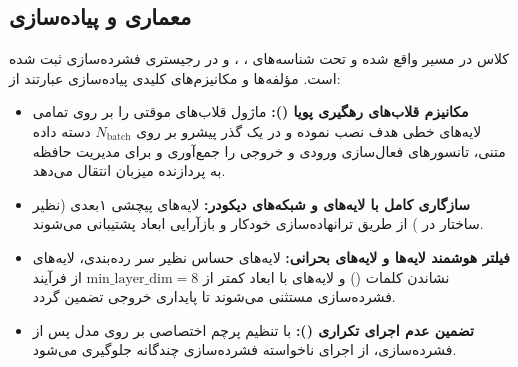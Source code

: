 \subsection{معماری و پیاده‌سازی}
کلاس  در مسیر  واقع شده و تحت شناسه‌های ، ،  و  در رجیستری فشرده‌سازی ثبت شده است. مؤلفه‌ها و مکانیزم‌های کلیدی پیاده‌سازی عبارتند از:
\begin{itemize}
    \item \textbf{مکانیزم قلاب‌های رهگیری پویا ():} ماژول قلاب‌های موقتی را بر روی تمامی لایه‌های خطی هدف نصب نموده و در یک گذر پیشرو بر روی $N_{\text{batch}}$ دسته داده متنی، تانسورهای فعال‌سازی ورودی و خروجی را جمع‌آوری و برای مدیریت حافظه به پردازنده میزبان انتقال می‌دهد.
    \item \textbf{سازگاری کامل با لایه‌های  و شبکه‌های دیکودر:} لایه‌های پیچشی ۱بعدی (نظیر ساختار  در ) از طریق ترانهاده‌سازی خودکار و بازآرایی ابعاد پشتیبانی می‌شوند.
    \item \textbf{فیلتر هوشمند لایه‌ها و لایه‌های بحرانی:} لایه‌های حساس نظیر سر رده‌بندی، لایه‌های نشاندن کلمات () و لایه‌های با ابعاد کمتر از $\text{min\_layer\_dim}=8$ از فرآیند فشرده‌سازی مستثنی می‌شوند تا پایداری خروجی تضمین گردد.
    \item \textbf{تضمین عدم اجرای تکراری ():} با تنظیم پرچم اختصاصی بر روی مدل پس از فشرده‌سازی، از اجرای ناخواسته فشرده‌سازی چندگانه جلوگیری می‌شود.
\end{itemize}
